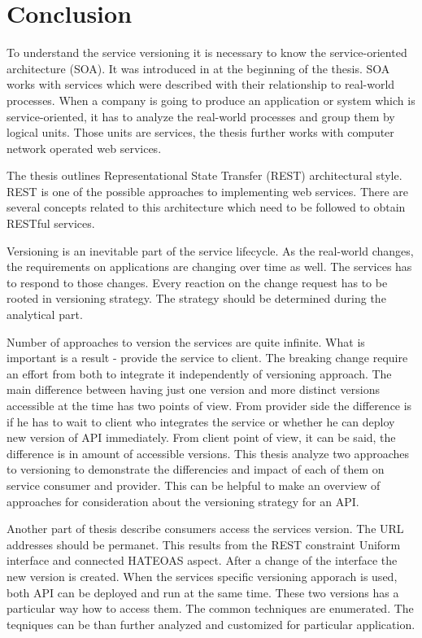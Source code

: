 \chapter{Conclusion}
\label{chap:conclusion}
To understand the service versioning it is necessary to know the service-oriented architecture (SOA). It was introduced in at the beginning of the thesis. SOA works with services which were described with their relationship to real-world processes. When a company is going to produce an application or system which is service-oriented, it has to analyze the real-world processes and group them by logical units. Those units are services, the thesis further works with computer network operated web services. 

The thesis outlines Representational State Transfer (REST) architectural style. REST is one of the possible approaches to implementing web services. There are several concepts related to this architecture which need to be followed to obtain RESTful services. 

Versioning is an inevitable part of the service lifecycle. As the real-world changes, the requirements on applications are changing over time as well. The services has to respond to those changes. Every reaction on the change request has to be rooted in versioning strategy. The strategy should be determined during the analytical part. 

Number of approaches to version the services are quite infinite. What is important is a result - provide the service to client. The breaking change require an effort from both to integrate it independently of versioning approach. The main difference between having just one version and more distinct versions accessible at the time has two points of view. From provider side the difference is if he has to wait to client who integrates the service or whether he can deploy new version of API immediately. From client point of view, it can be said, the difference is in amount of accessible versions. 
This thesis analyze two approaches to versioning to demonstrate the differencies and impact of each of them on service consumer and provider. This can be helpful to make an overview of approaches for consideration about the versioning strategy for an API. 

Another part of thesis describe consumers access the services version. The URL addresses should be permanet. This results from the REST constraint Uniform interface and connected HATEOAS aspect. After a change of the interface the new version is created. When the services specific versioning apporach is used, both API can be deployed and run at the same time. These two versions has a particular way how to access them. The common techniques are enumerated. The teqniques can be than further analyzed and customized for particular application. 


